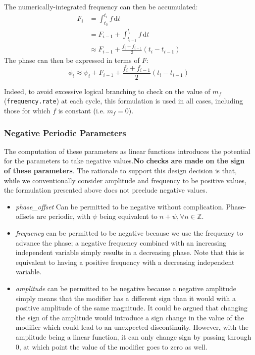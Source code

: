 \documentclass[11pt,fleqn]{report}
\begin{document}
The numerically-integrated frequency can then be accumulated:
\begin{align*}
  F_i &= \int_{t_0}^{t_i} f \, \mathrm{d}t \\
    &=  F_{i-1} + \int_{t_{i-1}}^{t_i} f \, \mathrm{d}t \\
    &\approx F_{i-1} + \frac{f_i + f_{i-1}}{2}  (t_i - t_{i-1})
\end{align*}
The phase can then be expressed in terms of $F$:
\begin{equation*}
  \phi_i \approx \psi_i + F_{i-1} + \frac{f_i + f_{i-1}}{2}  (t_i - t_{i-1})
\end{equation*}

Indeed, to avoid excessive logical branching to check on the value of $m_f$
(\verb'frequency.rate') at each cycle, this formulation is used in all cases,
including those for which $f$ is constant (i.e. $m_f = 0$).

\subsubsection {Negative Periodic Parameters}
The computation of these parameters as linear functions introduces the potential
for the parameters to take negative values.\textbf{No checks are made on the
sign of these parameters}. The rationale to support this design decision is
that, while we conventionally consider amplitude and frequency to be positive
values, the formulation presented above does not preclude negative values.
\begin{itemize}
 \item \textit{phase\_offset} Can be permitted to be negative without
   complication. Phase-offsets are periodic, with $\psi$ being equivalent to
   $n+\psi, \forall n \in \mathbb{Z}$.
 \item \textit{frequency} can be permitted to be negative because we use the
   frequency to
   advance the phase; a negative frequency combined with an increasing
   independent
   variable simply results in a decreasing phase. Note that this is equivalent
   to having a positive frequency with a decreasing independent variable.
 \item \textit{amplitude} can be permitted to be negative because a negative
   amplitude simply means that the modifier has a different sign than it would
   with a positive amplitude of the same magnitude. It could be argued that
   changing the sign of the
   amplitude would introduce a sign change in the value of the modifier which
   could lead to an unexpected discontinuity. However, with the amplitude being
   a linear function, it can only change sign by passing through 0, at which
   point the value of the modifier goes to zero as well.
\end{itemize}
\end{document}

